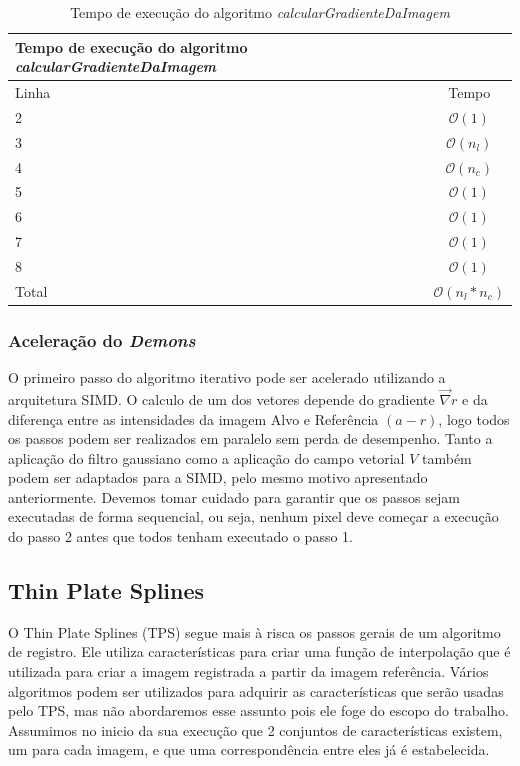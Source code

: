 \begin{table}[H]
\begin{center}
\begin{tabular}{l|c}
\hline
Tempo de execução do algoritmo \textit{calcularGradienteDaImagem} \\
\hline
Linha&Tempo\\
\hline
2       &$\mathcal{O}(1)$ \\
3       &$\mathcal{O}(n_l)$ \\
4       &$\mathcal{O}(n_c)$\\
5       &$\mathcal{O}(1)$\\
6       &$\mathcal{O}(1)$\\
7       &$\mathcal{O}(1)$\\
8       &$\mathcal{O}(1)$\\
\hline
Total   &$\mathcal{O}(n_l*n_c)$\\
\hline
\end{tabular}
\caption{Tempo de execução do algoritmo \textit{calcularGradienteDaImagem}}
\label{table:interpolar}
\end{center}
\end{table}

\subsubsection{Aceleração do \textit{Demons}}
    O primeiro passo do algoritmo iterativo pode ser acelerado utilizando a arquitetura SIMD. O calculo de um dos vetores
depende do gradiente $\vec{\nabla}r$ e da diferença entre as intensidades da imagem Alvo e Referência $(a - r)$, logo
todos os passos podem ser realizados em paralelo sem perda de desempenho. Tanto a aplicação do filtro gaussiano como
a aplicação do campo vetorial $V$ também podem ser adaptados para a SIMD, pelo mesmo motivo apresentado anteriormente.
Devemos tomar cuidado para garantir que os passos sejam executadas de forma sequencial, ou seja, nenhum pixel deve começar
a execução do passo 2 antes que todos tenham executado o passo 1.

\subsection{Thin Plate Splines}
    O Thin Plate Splines (TPS) segue mais à risca os passos gerais de um algoritmo de registro. Ele utiliza
características para criar uma função de interpolação que é utilizada para criar a imagem registrada a partir
da imagem referência. Vários algoritmos podem ser utilizados para adquirir as características que serão usadas
pelo TPS, mas não abordaremos esse assunto pois ele foge do escopo do trabalho. Assumimos no inicio da sua
execução que 2 conjuntos de características existem, um para cada imagem, e que uma correspondência entre
eles já é estabelecida.

